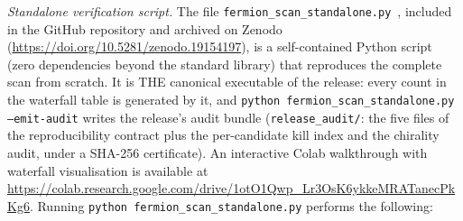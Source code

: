 \documentclass[11pt]{article}
\theoremstyle{definition}
\begin{document}
\smallskip\noindent\textit{Standalone verification script.}\quad
The file \texttt{fermion\_scan\_standalone.py}~\cite{BrookeFermionScan},
included in the GitHub repository and archived on Zenodo
(\url{https://doi.org/10.5281/zenodo.19154197}),
is a self-contained Python script (zero dependencies beyond the
standard library) that reproduces the complete scan from scratch.  It
is THE canonical executable of the release: every count in the
waterfall table is generated by it, and
\texttt{python fermion\_scan\_standalone.py --emit-audit} writes the
release's audit bundle (\texttt{release\_audit/}: the five files of
the reproducibility contract plus the per-candidate kill index and
the chirality audit, under a SHA-256 certificate).  An interactive
Colab walkthrough with waterfall visualisation is available at
\url{https://colab.research.google.com/drive/1otO1Qwp_Lr3OsK6ykkeMRATanecPkKg6}.
Running \texttt{python fermion\_scan\_standalone.py} performs the following:
\end{document}

